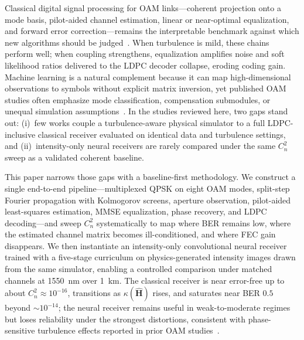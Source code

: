 \documentclass[journal]{IEEEtran}
\begin{document}
Classical digital signal processing for OAM links---coherent projection onto a mode basis, pilot-aided channel estimation, linear or near-optimal equalization, and forward error correction---remains the interpretable benchmark against which new algorithms should be judged~\cite{huang2014100, ge2021oam}. When turbulence is mild, these chains perform well; when coupling strengthens, equalization amplifies noise and soft likelihood ratios delivered to the LDPC decoder collapse, eroding coding gain. Machine learning is a natural complement because it can map high-dimensional observations to symbols without explicit matrix inversion, yet published OAM studies often emphasize mode classification, compensation submodules, or unequal simulation assumptions~\cite{liu2019oam_prl, doster2017machine, karanov2018endtoend, zhao2020cnn, lohani2018turbulence, arya2023oam}. In the studies reviewed here, two gaps stand out: (i)~few works couple a turbulence-aware physical simulator to a full LDPC-inclusive classical receiver evaluated on identical data and turbulence settings, and (ii)~intensity-only neural receivers are rarely compared under the same $C_n^2$ sweep as a validated coherent baseline.

This paper narrows those gaps with a baseline-first methodology. We construct a single end-to-end pipeline---multiplexed QPSK on eight OAM modes, split-step Fourier propagation with Kolmogorov screens, aperture observation, pilot-aided least-squares estimation, MMSE equalization, phase recovery, and LDPC decoding---and sweep $C_n^2$ systematically to map where BER remains low, where the estimated channel matrix becomes ill-conditioned, and where FEC gain disappears. We then instantiate an intensity-only convolutional neural receiver trained with a five-stage curriculum on physics-generated intensity images drawn from the same simulator, enabling a controlled comparison under matched channels at 1550~nm over 1~km. The classical receiver is near error-free up to about $C_n^2 \approx 10^{-16}$, transitions as $\kappa(\hat{\mathbf{H}})$ rises, and saturates near BER $0.5$ beyond $\sim 10^{-14}$; the neural receiver remains useful in weak-to-moderate regimes but loses reliability under the strongest distortions, consistent with phase-sensitive turbulence effects reported in prior OAM studies~\cite{ren2013atmospheric, paterson2005atmospheric}.
\end{document}
